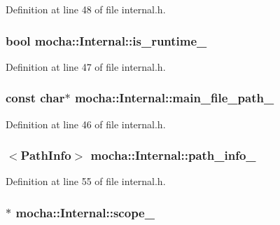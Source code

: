Definition at line 48 of file internal.h.

\hypertarget{classmocha_1_1_internal_a0e4225ddc86465d35cdef3dac4211df1}{
\subsubsection[{is\_\-runtime\_\-}]{\setlength{\rightskip}{0pt plus 5cm}bool {\bf mocha::Internal::is\_\-runtime\_\-}}}
\label{classmocha_1_1_internal_a0e4225ddc86465d35cdef3dac4211df1}


Definition at line 47 of file internal.h.

\hypertarget{classmocha_1_1_internal_a078269b0ed348d8581f3acdae618e394}{
\subsubsection[{main\_\-file\_\-path\_\-}]{\setlength{\rightskip}{0pt plus 5cm}const char$\ast$ {\bf mocha::Internal::main\_\-file\_\-path\_\-}}}
\label{classmocha_1_1_internal_a078269b0ed348d8581f3acdae618e394}


Definition at line 46 of file internal.h.

\hypertarget{classmocha_1_1_internal_a3ad557772e8614820d6755ae0eb1aa77}{
\subsubsection[{path\_\-info\_\-}]{$<${\bf PathInfo}$>$ {\bf mocha::Internal::path\_\-info\_\-}}}
\label{classmocha_1_1_internal_a3ad557772e8614820d6755ae0eb1aa77}


Definition at line 55 of file internal.h.

\hypertarget{classmocha_1_1_internal_af9c954ecf5256edb08ab163ecf8bc967}{
\subsubsection[{scope\_\-}]{$\ast$ {\bf mocha::Internal::scope\_\-}}}
\label{classmocha_1_1_internal_af9c954ecf5256edb08ab163ecf8bc967}


